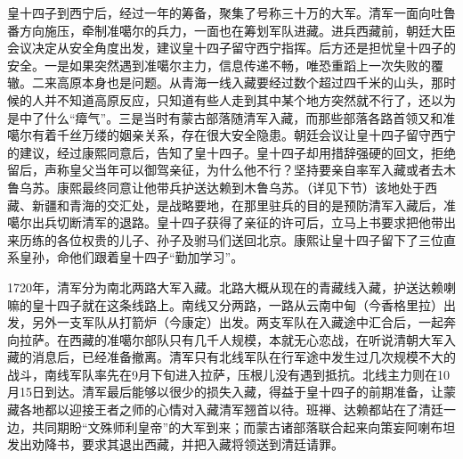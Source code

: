 
皇十四子到西宁后，经过一年的筹备，聚集了号称三十万的大军。清军一面向吐鲁番方向施压，牵制准噶尔的兵力，一面也在筹划军队进藏。进兵西藏前，朝廷大臣会议决定从安全角度出发，建议皇十四子留守西宁指挥。后方还是担忧皇十四子的安全。一是如果突然遇到准噶尔主力，信息传递不畅，唯恐重蹈上一次失败的覆辙。二来高原本身也是问题。从青海一线入藏要经过数个超过四千米的山头，那时候的人并不知道高原反应，只知道有些人走到其中某个地方突然就不行了，还以为是中了什么“瘴气”。三是当时有蒙古部落随清军入藏，而那些部落各路首领又和准噶尔有着千丝万缕的姻亲关系，存在很大安全隐患。朝廷会议让皇十四子留守西宁的建议，经过康熙同意后，告知了皇十四子。皇十四子却用措辞强硬的回文，拒绝留后，声称皇父当年可以御驾亲征，为什么他不行？坚持要亲自率军入藏或者去木鲁乌苏。康熙最终同意让他带兵护送达赖到木鲁乌苏。（详见下节）该地处于西藏、新疆和青海的交汇处，是战略要地，在那里驻兵的目的是预防清军入藏后，准噶尔出兵切断清军的退路。皇十四子获得了亲征的许可后，立马上书要求把他带出来历练的各位权贵的儿子、孙子及驸马们送回北京。康熙让皇十四子留下了三位直系皇孙，命他们跟着皇十四子“勤加学习”。



1720年，清军分为南北两路大军入藏。北路大概从现在的青藏线入藏，护送达赖喇嘛的皇十四子就在这条线路上。南线又分两路，一路从云南中甸（今香格里拉）出发，另外一支军队从打箭炉（今康定）出发。两支军队在入藏途中汇合后，一起奔向拉萨。在西藏的准噶尔部队只有几千人规模，本就无心恋战，在听说清朝大军入藏的消息后，已经准备撤离。清军只有北线军队在行军途中发生过几次规模不大的战斗，南线军队率先在9月下旬进入拉萨，压根儿没有遇到抵抗。北线主力则在10月15日到达。清军最后能够以很少的损失入藏，得益于皇十四子的前期准备，让蒙藏各地都以迎接王者之师的心情对入藏清军翘首以待。班禅、达赖都站在了清廷一边，共同期盼“文殊师利皇帝”的大军到来；而蒙古诸部落联合起来向策妄阿喇布坦发出劝降书，要求其退出西藏，并把入藏将领送到清廷请罪。


